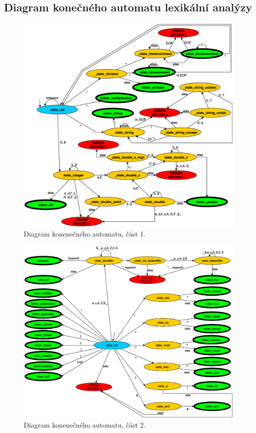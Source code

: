 \documentclass[a4paper, 11pt]{article}
\begin{document}
	\subsection{Diagram konečného automatu lexikální analýzy}\bigskip
	\begin{center}
        \begin{figure}[h]
		    \includegraphics[scale=0.4]{docs/FSM_part1}
            \caption{Diagram konenečného automatu, část 1.}
        \end{figure}
        \begin{figure}[t]
		    \includegraphics[scale=0.4]{docs/FSM_part2}
            \caption{Diagram konenečného automatu, část 2.}
        \end{figure}
	\end{center}
\end{document}

